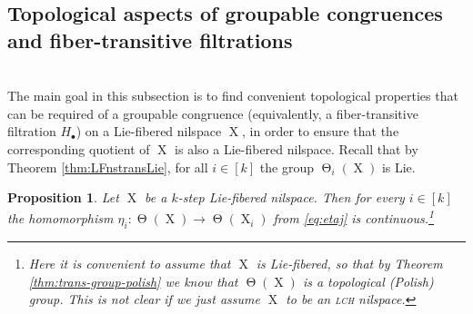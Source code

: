 \documentclass[a4paper,12pt,reqno]{amsart}
\newtheorem{proposition}[theorem]{Proposition}
\theoremstyle{definition}
\def\to{\rightarrow}
\DeclareMathOperator{\tran}{\Theta}
\DeclareMathOperator{\ns}{X}
\begin{document}
\subsection{Topological aspects of groupable congruences and fiber-transitive filtrations}\hfill\smallskip\\
The main goal in this subsection is to find convenient topological properties that can be required of a groupable congruence (equivalently, a fiber-transitive filtration $H_\bullet$) on a Lie-fibered nilspace $\ns$, in order to ensure that the corresponding quotient of $\ns$ is also a Lie-fibered nilspace. Recall that by Theorem \ref{thm:LFnstransLie}, for all $i\in[k]$ the group $\tran_i(\ns)$ is Lie.
\begin{proposition}
Let $\ns$ be a $k$-step Lie-fibered nilspace. Then for every $i\in [k]$ the homomorphism $\eta_i:\tran(\ns)\to \tran(\ns_i)$ from \eqref{eq:etaj} is continuous.\footnote{Here it is convenient to assume that $\ns$ is Lie-fibered, so that by Theorem \ref{thm:trans-group-polish} we know that $\tran(\ns)$ is a topological (Polish) group. This is not clear if we just assume $\ns$ to be an \textsc{lch} nilspace.}
\end{proposition}
\end{document}
